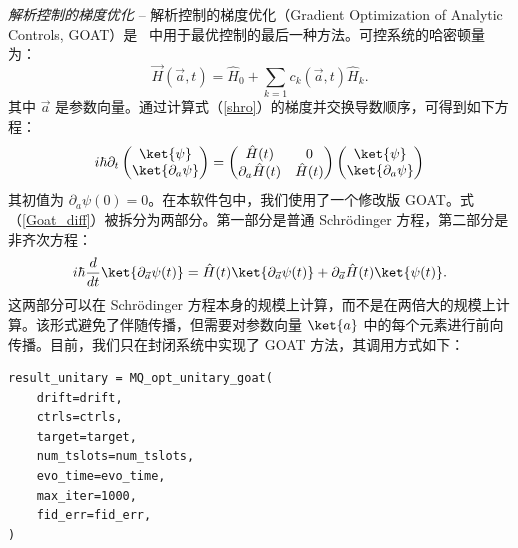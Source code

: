 \textit{解析控制的梯度优化} -- 解析控制的梯度优化（Gradient Optimization of Analytic Controls, GOAT）是 \MindQuantum\ 中用于最优控制的最后一种方法。可控系统的哈密顿量为：
\begin{equation}
    \vec{H}(\vec{a},t)=\hat{H}_{0}+\sum_{k=1}c_{k}(\vec{a},t)\hat{H}_{k}.
\end{equation}
其中 $\vec{a}$ 是参数向量。通过计算式（\ref{shro}）的梯度并交换导数顺序，可得到如下方程：
\begin{equation}
    i\hbar\partial_{t}
    \begin{pmatrix}
        \ket{\psi} \\
        \ket{\partial_{a}\psi}
    \end{pmatrix}
    =
    \begin{pmatrix}
        \hat{H}(t)             & 0          \\
        \partial_{a}\hat{H}(t) & \hat{H}(t)
    \end{pmatrix}
    \begin{pmatrix}
        \ket{\psi} \\
        \ket{\partial_{a}\psi}
    \end{pmatrix}
    \label{Goat_diff}
\end{equation}
其初值为 $\partial_{a}\psi(0)=0$。在本软件包中，我们使用了一个修改版 GOAT。式（\ref{Goat_diff}）被拆分为两部分。第一部分是普通 Schr\"{o}dinger 方程，第二部分是非齐次方程：
\begin{equation}
    i\hbar\frac{d}{dt}\ket{\partial_{\vec{a}}\psi(t)}=\hat{H}(t)\ket{\partial_{\vec{a}}\psi(t)}+\partial_{\vec{a}}\hat{H}(t)\ket{\psi(t)}.
\end{equation}
这两部分可以在 Schr\"{o}dinger 方程本身的规模上计算，而不是在两倍大的规模上计算。该形式避免了伴随传播，但需要对参数向量 $\ket{a}$ 中的每个元素进行前向传播。目前，我们只在封闭系统中实现了 GOAT 方法，其调用方式如下：
\begin{lstlisting}
result_unitary = MQ_opt_unitary_goat(
    drift=drift,
    ctrls=ctrls,
    target=target,
    num_tslots=num_tslots,
    evo_time=evo_time,
    max_iter=1000,
    fid_err=fid_err,
)
\end{lstlisting}
